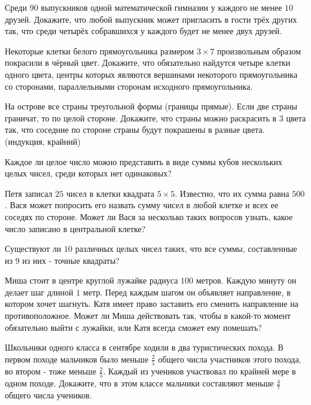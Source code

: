 \documentclass[12pt]{article}
\begin{document}
\begin{task}
Среди $90$ выпускников одной математической гимназии у каждого не менее $10$ друзей. Докажите, что любой выпускник может пригласить в гости трёх других так, что среди четырёх собравшихся у каждого будет не менее двух друзей.
\end{task}

\begin{task}
Некоторые клетки белого прямоугольника размером $3 \times 7$ произвольным образом покрасили в чёрный цвет. Докажите, что обязательно найдутся четыре клетки одного цвета, центры которых являются вершинами некоторого прямоугольника со сторонами, параллельными сторонам исходного прямоугольника. 
\end{task}

\begin{task}
На острове все страны треугольной формы (границы прямые). Если две страны граничат, то по целой стороне. Докажите, что страны можно раскрасить в $3$ цвета так, что соседние по стороне страны будут покрашены в разные цвета. (индукция, крайний)
\end{task}

\begin{task}
Каждое ли целое число можно представить в виде суммы кубов нескольких целых чисел, среди которых нет одинаковых?
\end{task}

\begin{task}
Петя записал $25$ чисел в клетки квадрата $5 \times 5$. Известно, что их сумма равна $500$. Вася может попросить его назвать сумму чисел в любой клетке и всех ее соседях по стороне. Может ли Вася за несколько таких вопросов узнать, какое число записано в центральной клетке?
\end{task}

\begin{task}
Существуют ли $10$ различных целых чисел таких, что все суммы, составленные из $9$ из них - точные квадраты?
\end{task}

\begin{task}
Миша стоит в центре круглой лужайке радиуса $100$ метров. Каждую минуту он делает шаг длиной $1$ метр. Перед каждым шагом он объявляет направление, в котором хочет шагнуть. Катя имеет право заставить его сменить направление на противоположное. Может ли Миша действовать так, чтобы в какой-то момент обязательно выйти с лужайки, или Катя всегда сможет ему помешать? 
\end{task}

\begin{task}
Школьники одного класса в сентябре ходили в два туристических похода. В первом походе мальчиков было меньше $\frac{2}{5}$ общего числа участников этого похода, во втором - тоже меньше $\frac{2}{5}$. Каждый из учеников участвовал по крайней мере в одном походе. Докажите, что в этом классе мальчики составляют меньше $\frac{4}{7}$ общего числа учеников.
\end{task}
\end{document}
